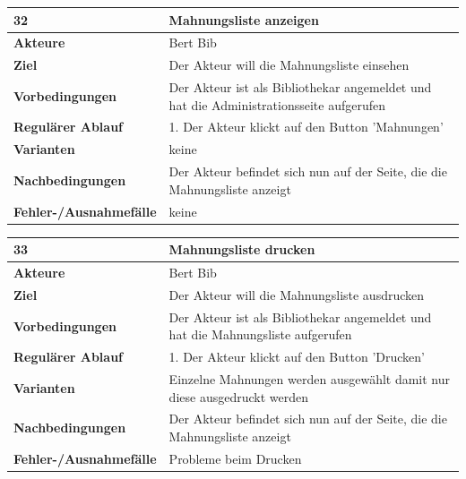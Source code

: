 \documentclass[fontsize=12pt,paper=a4,twoside]{scrartcl}
\begin{document}
\begin{table}[htbp]
\label{32}
\begin{tabular}{|l|p{10cm}|}
\hline 
\textbf{32} & \textbf{Mahnungsliste anzeigen} \\ \hline
\textbf{Akteure} & Bert Bib\\ \hline
\textbf{Ziel} & Der Akteur will die Mahnungsliste einsehen \\ \hline
\textbf{Vorbedingungen} & Der Akteur ist als Bibliothekar angemeldet und hat die Administrationsseite aufgerufen \\ \hline
\textbf{Regulärer Ablauf} & 
1. Der Akteur klickt auf den Button 'Mahnungen' \\
\hline
\textbf{Varianten} & 
keine \\ \hline
\textbf{Nachbedingungen} & Der Akteur befindet sich nun auf der Seite, die die Mahnungsliste anzeigt\\ \hline
\textbf{Fehler-/Ausnahmefälle} & keine\\
\hline
\end{tabular}
\end{table}

\begin{table}[htbp]
\label{33}
\begin{tabular}{|l|p{10cm}|}
\hline 
\textbf{33} & \textbf{Mahnungsliste drucken} \\ \hline
\textbf{Akteure} & Bert Bib\\ \hline
\textbf{Ziel} & Der Akteur will die Mahnungsliste ausdrucken \\ \hline
\textbf{Vorbedingungen} & Der Akteur ist als Bibliothekar angemeldet und hat die Mahnungsliste aufgerufen \\ \hline
\textbf{Regulärer Ablauf} & 
1. Der Akteur klickt auf den Button 'Drucken' \\
\hline
\textbf{Varianten} & 
Einzelne Mahnungen werden ausgewählt damit nur diese ausgedruckt werden \\ \hline
\textbf{Nachbedingungen} & Der Akteur befindet sich nun auf der Seite, die die Mahnungsliste anzeigt\\ \hline
\textbf{Fehler-/Ausnahmefälle} & Probleme beim Drucken\\
\hline
\end{tabular}
\end{table}
\end{document}
